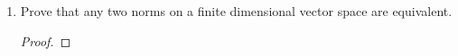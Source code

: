 \documentclass[../psets.tex]{subfiles}
\begin{document}
\begin{enumerate}
\begin{enumerate}
\begin{proof}
        \end{proof}
        \item Prove that any two norms on a finite dimensional vector space are equivalent.
        \begin{proof}
            



\end{proof}
\end{enumerate}
\end{enumerate}
\end{document}
